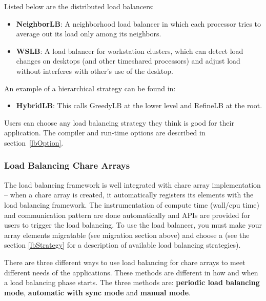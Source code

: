 Listed below are the distributed load balancers:
\begin{itemize}
\item {\bf NeighborLB}:   A neighborhood load balancer in which each processor tries to average out its load only among its neighbors.
\item {\bf WSLB}:   A load balancer for workstation clusters, which can detect load changes on desktops (and other timeshared processors) and adjust load without interferes with other's use of the desktop.
\end{itemize}

An example of a hierarchical strategy can be found in:
\begin{itemize}
\item {\bf HybridLB}: This calls GreedyLB at the lower level and RefineLB at
the root.
\end{itemize}

Users can choose any load balancing strategy they think is good for their
application. The compiler and run-time options are described in
section~\ref{lbOption}.


\subsubsection{Load Balancing Chare Arrays}
\label{lbarray}

The load balancing framework is well integrated with chare array implementation
-- when a chare array is created, it automatically registers its elements with
the load balancing framework. The instrumentation of compute time (wall/cpu
time) and communication pattern are done automatically and APIs are provided
for users to trigger the load balancing.  To use the load balancer, you must
make your array elements migratable (see migration section above) and choose a
 (see the section \ref{lbStrategy} for a
description of available load balancing strategies).

There are three different ways to use load balancing for chare arrays to meet
different needs of the applications. These methods are different in how and
when a load balancing phase starts. The three methods are: {\bf periodic load
balancing mode}, {\bf automatic with sync mode} and {\bf manual mode}.

